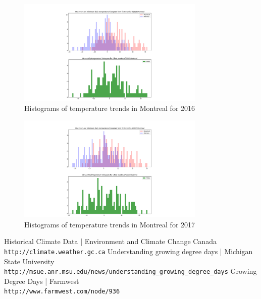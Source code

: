 \documentclass[12pt]{article}
\begin{document}
\begin{figure}[!htbp]
\centering
\includegraphics[width=0.8\textwidth]{./docs/histogram2016.png} 
\caption{\scriptsize Histograms of temperature trends in Montreal for 2016}
\label{hist2016}		  
\end{figure}

\begin{figure}[!htbp]
\centering
\includegraphics[width=0.8\textwidth]{./docs/histogram2017.png} 
\caption{\scriptsize Histograms of temperature trends in Montreal for 2017}
\label{hist2017}		  
\end{figure}


\pagebreak




\begin{thebibliography}{2}
Historical Climate Data | Environment and Climate Change Canada
\\\texttt{http://climate.weather.gc.ca}
Understanding growing degree days | Michigan State University
\\\texttt{http://msue.anr.msu.edu/news/understanding\_growing\_degree\_days}
Growing Degree Days | Farmwest
\\\texttt{http://www.farmwest.com/node/936}
\end{thebibliography}
\end{document}
